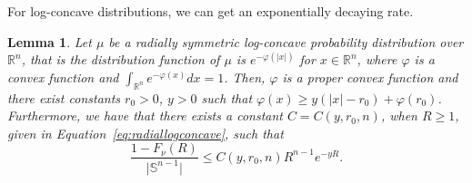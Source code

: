 \documentclass{amsart}
\theoremstyle{lemma}
\newtheorem{lemma}[theorem]{Lemma}
\theoremstyle{remark}
\begin{document}
For log-concave distributions, we can get an exponentially decaying rate.

\begin{lemma}\label{lemma:logcon}
Let $\mu$ be a radially symmetric log-concave probability distribution over $\mathbb{R}^n$, that is the distribution function of $\mu$ is $e^{-\varphi( \vert x \vert)}$ for $x \in \mathbb{R}^n$, where $\varphi$ is a convex function and $\int_{\mathbb{R}^n} e^{-\varphi(x)}dx = 1$. Then, $\varphi$ is a proper convex function and there exist constants $r_0>0$, $y>0$ such that $\varphi(x) \geq y(\vert x \vert - r_0) + \varphi(r_0)$. Furthermore, we have that there exists a constant $C = C(y, r_0, n)$, when $R \geq 1$, given in Equation~\eqref{eq:radiallogconcave}, such that
\begin{equation}
\frac{1-F_{\nu}(R)}{\vert \mathbb{S}^{n-1} \vert} \leq C(y, r_0, n)R^{n-1}e^{-yR}.
\end{equation}
\end{lemma}
\end{document}
